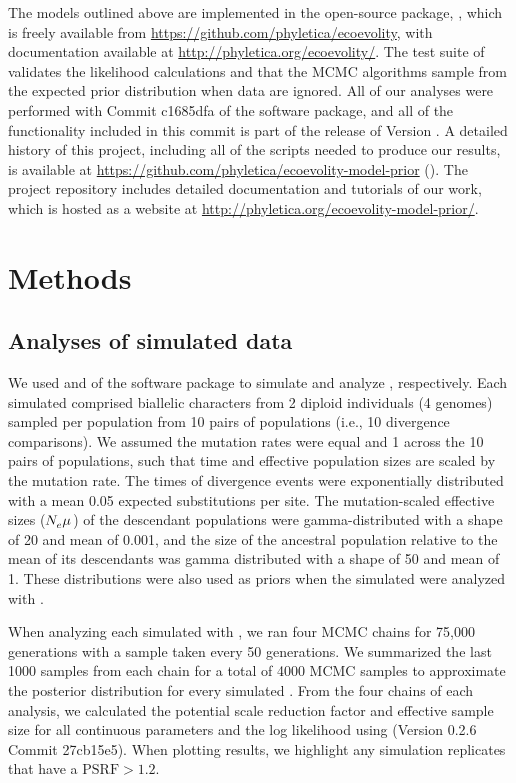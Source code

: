 \documentclass[letterpaper,12pt]{article}
\begin{document}
The models outlined above are implemented in the open-source \cpp package,
\ecoevolity, which is freely available from
\url{https://github.com/phyletica/ecoevolity}, with documentation available
at
\url{http://phyletica.org/ecoevolity/}.
The test suite of \ecoevolity
validates the likelihood calculations and that the MCMC algorithms sample from
the expected prior distribution when data are ignored.
All of our analyses were performed with
Commit c1685dfa
of the \ecoevolity software package,
and all of the functionality included in this commit is part of
the release of Version .
A detailed history of this project, including all of the scripts
needed to produce our results, is available at
\url{https://github.com/phyletica/ecoevolity-model-prior}
().
The project repository includes detailed documentation and tutorials of our
work, which is hosted as a website at
\url{http://phyletica.org/ecoevolity-model-prior/}.

\section{Methods}

\subsection{Analyses of simulated data}

We used \simcoevolity and \ecoevolity of the \ecoevolity software
package
\citep[Version 0.3.2 Commit c1685dfa][]{Oaks2018ecoevolity}
to simulate and analyze \datasets, respectively.
Each simulated \dataset comprised biallelic characters from 2 diploid
individuals (4 genomes) sampled per population from 10 pairs of populations
(i.e., 10 divergence comparisons).
We assumed the mutation rates were equal and 1 across the 10 pairs of
populations, such that time and effective population sizes are scaled by the
mutation rate.
The times of divergence events were exponentially distributed with a mean 0.05
expected substitutions per site.
The mutation-scaled effective sizes ($N_{e}^{}\mu_{}$) of the descendant
populations were gamma-distributed with a shape of 20 and mean of 0.001,
and the size of the ancestral population relative to the mean of its
descendants was gamma distributed with a shape of 50 and mean of 1.
These distributions were also used as priors when the simulated \datasets were
analyzed with \ecoevolity.


When analyzing each simulated \dataset with \ecoevolity,
we ran four MCMC chains for 75,000 generations with a sample taken every 50
generations.
We summarized the last 1000 samples from each chain for a total of 4000 MCMC
samples to approximate the posterior distribution for every simulated \dataset.
From the four chains of each analysis, we calculated the potential
scale reduction factor \citep[PSRF; the square root of Equation 1.1
in][]{Brooks1998} and effective sample size \citep[ESS;][]{Gong2014} for all
continuous parameters and the log likelihood using
\pycoevolity (Version 0.2.6 Commit 27cb15e5).
When plotting results, we highlight any simulation replicates that have a
$\textrm{PSRF} > 1.2$.
\end{document}
